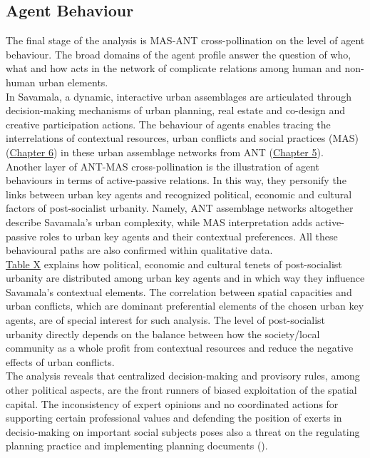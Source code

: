 \documentclass[11pt]{report}
\begin{document}
\subsection{Agent Behaviour}

The final stage of the analysis is MAS-ANT cross-pollination on the level of agent behaviour.
The broad  domains  of  the  agent  profile  answer  the  question  of  who,  what  and  how  acts  in  the  network  of complicate relations among human and non-human urban elements.
\\

In Savamala, a dynamic, interactive urban assemblages are articulated through decision-making mechanisms of urban planning, real estate and co-design and creative participation actions.
The behaviour of agents enables tracing the interrelations of contextual resources, urban conflicts and social practices (MAS) (\href{Chapter 6}{Chapter 6}) in these urban assemblage networks from ANT (\href{Chapter 5}{Chapter 5}).
\\

Another layer of ANT-MAS cross-pollination is the illustration of agent behaviours in terms of active-passive relations.
In this way, they personify the links between urban key agents and recognized political, economic and cultural factors of post-socialist urbanity. 
Namely, ANT assemblage networks altogether describe Savamala's urban complexity, while MAS interpretation adds active-passive roles to urban key agents and their contextual preferences. 
All these behavioural paths are also confirmed within qualitative data.
\\

\href{TableX}{Table X} explains how political, economic and cultural tenets of post-socialist urbanity are distributed among urban key agents and in which way they influence Savamala's contextual elements.
The correlation between spatial capacities and urban conflicts, which are dominant preferential elements of the chosen urban key agents, are of special interest for such analysis.
The level of post-socialist urbanity directly depends on the balance between how the society/local community as a whole profit from contextual resources and reduce the negative effects of urban conflicts.
\\

The analysis reveals that centralized decision-making and provisory rules, among other political aspects, are the front runners of biased exploitation of the spatial capital.
The inconsistency of expert opinions and no coordinated actions for supporting certain professional values and defending the position of exerts in decisio-making on important social subjects poses also a threat on the regulating planning practice and implementing planning documents (\href{Vukmirovic}{\cite{vukmirovic_city_2013}}).
\\
\end{document}
